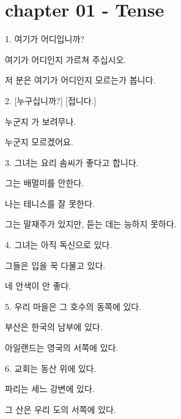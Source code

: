 \section{chapter 01 - Tense}\label{chapter01}

\begin{problem}{1. }
    여기가 어디입니까?

    여기가 어디인지 가르쳐 주십시오.

    저 분은 여기가 어디인지 모르는가 봅니다.
    \vspace{1pc}
\end{problem}

\begin{problem}{2. }
    [누구십니까?] [접니다.]

    누군지 가 보려무나.

    누군지 모르겠어요.
    \vspace{1pc}
\end{problem}

\begin{problem}{3. }
    그녀는 요리 솜씨가 좋다고 합니다.

    그는 배멀미를 안한다.

    나는 테니스를 잘 못한다.

    그는 말재주가 있지만, 듣는 데는 능하지 못하다.
    \vspace{1pc}
\end{problem}

\begin{problem}{4. }
    그녀는 아직 독신으로 있다.

    그들은 입을 꾹 다물고 있다.

    네 안색이 안 좋다.
    \vspace{1pc}
\end{problem}

\begin{problem}{5. }
    우리 마을은 그 호수의 동쪽에 있다.

    부산은 한국의 남부에 있다.

    아일랜드는 영국의 서쪽에 있다.
    \vspace{1pc}
\end{problem}

\begin{problem}{6. }
    교회는 동산 위에 있다.

    파리는 세느 강변에 있다.

    그 산은 우리 도의 서쪽에 있다.
    \vspace{1pc}
\end{problem}

